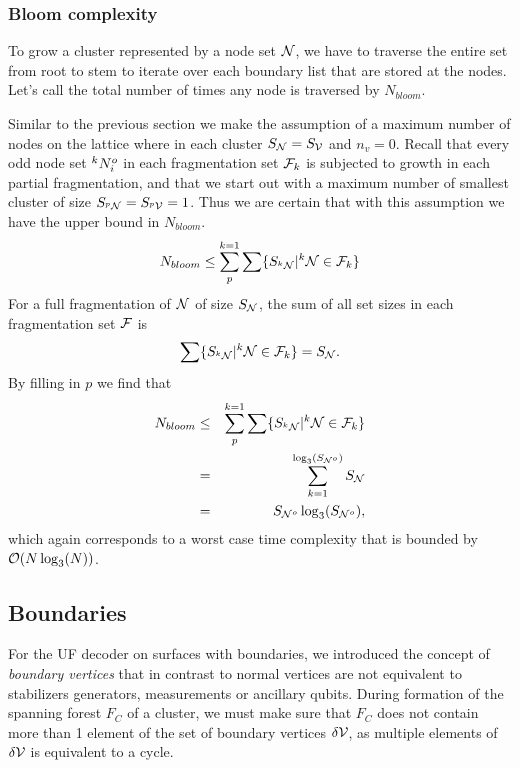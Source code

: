 \subsubsection{Bloom complexity}

To grow a cluster represented by a node set $\mathcal{N}$, we have to traverse the entire set from root to stem to iterate over each boundary list that are stored at the nodes. Let's call the total number of times any node is traversed by  $N_{bloom}$.

Similar to the previous section we make the assumption of a maximum number of nodes on the lattice where in each cluster $S_{\mathcal{N}} = S_{\mathcal{V}}$ and $n_v = 0$. Recall that every odd node set ${}^{k}N^o_i$ in each fragmentation set $\mathcal{F}_k$ is subjected to growth in each partial fragmentation, and that we start out with a maximum number of smallest cluster of size $S_{{}^{p}\mathcal{N}} = S_{{}^{p}\mathcal{V}} = 1$. Thus we are certain that with this assumption we have the upper bound in $N_{bloom}$.
\begin{equation}\label{eq:nnode}
  N_{bloom} \leq \sum_{p}^{k=1}\sum \{ S_{{}^{k}\mathcal{N}} | {}^{k}\mathcal{N} \in \mathcal{F}_k \}
\end{equation}
For a full fragmentation of $\mathcal{N}$ of size $S_{\mathcal{N}}$, the sum of all set sizes in each fragmentation set $\mathcal{F}$ is
\begin{equation}\label{eq:sumsetsfrag}
  \sum \{S_{{}^{k}\mathcal{N}} | {}^{k}\mathcal{N} \in \mathcal{F}_k \} = S_{\mathcal{N}}.
\end{equation}
By filling in $p$ we find that
\begin{eqnarray}
  \nonumber N_{bloom} &\leq& \sum_{p}^{k=1}\sum \{ S_{{}^{k}\mathcal{N}} | {}^{k}\mathcal{N} \in \mathcal{F}_k \} \\
  \nonumber &=& \sum_{k=1}^{\log_3(S_{\mathcal{N}^o})} S_{\mathcal{N}} \\
   &=& S_{\mathcal{N}^o}\log_3(S_{\mathcal{N}^o}),
\end{eqnarray}
which again corresponds to a worst case time complexity that is bounded by $\mathcal{O}(N\log_3(N))$.

\subsection{Boundaries}

For the UF decoder on surfaces with boundaries, we introduced the concept of \emph{boundary vertices} that in contrast to normal vertices are not equivalent to stabilizers generators, measurements or ancillary qubits. During formation of the spanning forest $F_C$ of a cluster, we must make sure that $F_C$ does not contain more than 1 element of the set of boundary vertices $\delta\mathcal{V}$, as multiple elements of $\delta\mathcal{V}$ is equivalent to a cycle.


